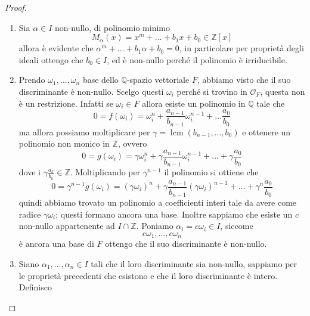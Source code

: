 \begin{proof}\
	\begin{enumerate}
		\item Sia $\alpha\in I$ non-nullo, di polinomio minimo 
		\begin{equation*}
		M_\alpha(x)=x^m+\dots+b_1x+b_0\in\mathbb{Z}[x]
		\end{equation*}
		allora è evidente che $\alpha^m+\dots+b_1\alpha+b_0=0$, in particolare per proprietà degli ideali ottengo che $b_0\in I$, ed è non-nullo perché il polinomio è irriducibile.
		\item Prendo $\omega_1,\dots,\omega_n$ base dello $\mathbb{Q}$-spazio vettoriale $F$, abbiamo visto che il suo discriminante è non-nullo. Scelgo questi $\omega_i$ perché si trovino in $\mathcal{O}_F$, questa non è un restrizione. Infatti se $\omega_i \in F$ allora esiste un polinomio in $\mathbb{Q}$ tale che 
		\begin{equation*}
			0 = f(\omega_i) = \omega_i^n + \frac{a_{n-1}}{b_{n-1}}\omega_i^{n-1} + \dots \frac{a_0}{b_0}
		\end{equation*}
		ma allora possiamo moltiplicare per $\gamma = \operatorname{lcm}(b_{n-1}, \dots, b_0)$ e ottenere un polinomio non monico in $\mathbb{Z}$, ovvero 
		\begin{equation*}
			0 = g(\omega_i) = \gamma \omega_i^n + \gamma \frac{a_{n-1}}{b_{n-1}} \omega_i^{n-1} + \dots + \gamma \frac{a_0}{b_0} 
		\end{equation*}
		dove i $\gamma \frac{a_{k}}{b_{k}} \in \mathbb{Z}$. Moltiplicando per $\gamma^{n-1}$ il polinomio si ottiene che 
		\begin{equation*}
			0 = \gamma^{n-1}g(\omega_i) = (\gamma\omega_i)^n + \gamma \frac{a_{n-1}}{b_{n-1}}(\gamma\omega_i)^{n-1} + \dots + \gamma^n \frac{a_0}{b_0}
		\end{equation*}
		quindi abbiamo trovato un polinomio a coefficienti interi tale da avere come radice $\gamma \omega_i$; questi formano ancora una base. Inoltre sappiamo che esiste un $c$ non-nullo appartenente ad $I\cap\mathbb{Z}$. Poniamo $\alpha_i=c\omega_i\in I$, siccome 
		\begin{equation*}
		c\omega_1,\dots,c\omega_n
		\end{equation*}
		è ancora una base di $F$ ottengo che il suo discriminante è non-nullo.
		\item Siano $\alpha_1,\dots,\alpha_n\in I$ tali che il loro discriminante sia non-nullo, sappiamo per le proprietà precedenti che esistono e che il loro discriminante è intero. Definisco
		\begin{equation*}

\end{equation*}
\end{enumerate}
\end{proof}
